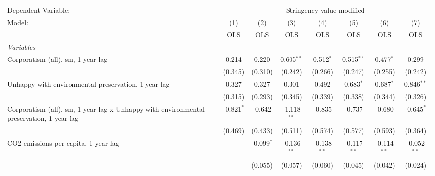
\begingroup
\centering
\begin{tabular}{lccccccc}
   \toprule
   Dependent Variable: & \multicolumn{7}{c}{Stringency value modified}\\
   Model:                                                                                  & (1)          & (2)          & (3)           & (4)           & (5)           & (6)           & (7)\\  
                                                                                           &  OLS         & OLS          & OLS           & OLS           & OLS           & OLS           & OLS\\  
   \midrule
   \emph{Variables}\\
   Corporatism (all), sm, 1-year lag                                                       & 0.214        & 0.220        & 0.605$^{**}$  & 0.512$^{*}$   & 0.515$^{**}$  & 0.477$^{*}$   & 0.299\\   
                                                                                           & (0.345)      & (0.310)      & (0.242)       & (0.266)       & (0.247)       & (0.255)       & (0.242)\\   
   Unhappy with environmental preservation, 1-year lag                                     & 0.327        & 0.327        & 0.301         & 0.492         & 0.683$^{*}$   & 0.687$^{*}$   & 0.846$^{**}$\\   
                                                                                           & (0.315)      & (0.293)      & (0.345)       & (0.339)       & (0.338)       & (0.344)       & (0.326)\\   
   Corporatism (all), sm, 1-year lag x Unhappy with environmental preservation, 1-year lag & -0.821$^{*}$ & -0.642       & -1.118$^{**}$ & -0.835        & -0.737        & -0.680        & -0.645$^{*}$\\   
                                                                                           & (0.469)      & (0.433)      & (0.511)       & (0.574)       & (0.577)       & (0.593)       & (0.364)\\   
   CO2 emissions per capita, 1-year lag                                                    &              & -0.099$^{*}$ & -0.136$^{**}$ & -0.138$^{**}$ & -0.117$^{**}$ & -0.114$^{**}$ & -0.052$^{**}$\\   
                                                                                           &              & (0.055)      & (0.057)       & (0.060)       & (0.045)       & (0.042)       & (0.024)\\   

\end{tabular}
